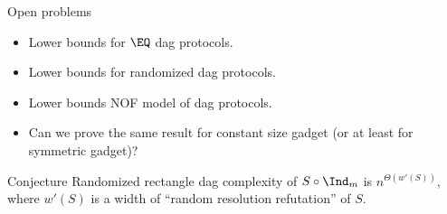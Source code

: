 \begin{frame}{Open problems}

    \begin{itemize}
        \item Lower bounds for $\EQ$ dag protocols.
        \item Lower bounds for randomized dag protocols.
        \item Lower bounds NOF model of dag protocols.
        \item Can we prove the same result for constant size gadget (or at least for symmetric gadget)?
    \end{itemize}

    \pause
    \begin{block}{Conjecture}
        Randomized rectangle dag complexity of $S \circ \Ind_{m}$ is $n^{\Theta(w'(S))}$, where $w'(S)$
        is a width of ``random resolution refutation'' of $S$.
    \end{block}
\end{frame}